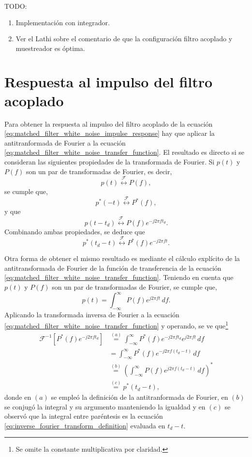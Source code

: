 \documentclass[a4paper]{article}
\begin{document}
% 
\vspace{1cm}
TODO:
\begin{enumerate}
 \item Implementación con integrador.
 \item Ver el Lathi sobre el comentario de que la configuración filtro acoplado y muestreador es óptima.
\end{enumerate}


\newpage

\appendix

\section{Respuesta al impulso del filtro acoplado}\label{ap:matched_filter_impulse_response_derivation}

Para obtener la respuesta al impulso del filtro acoplado de la ecuación \ref{eq:matched_filter_white_noise_impulse_response} hay que aplicar la antitranformada de Fourier a la ecuación \ref{eq:matched_filter_white_noise_transfer_function}. El resultado es directo si se consideran las siguientes propiedades de la transformada de Fourier. Si \(p(t)\) y \(P(f)\) son un par de transformadas de Fourier, es decir,
\[
 p(t)\overset{\mathcal{F}}{\longleftrightarrow}P(f),
\]
 se cumple que,
\[
 p^*(-t)\overset{\mathcal{F}}{\longleftrightarrow}P^*(f),
\]
y que
\[
 p(t-t_d)\overset{\mathcal{F}}{\longleftrightarrow}P(f)e^{-j2\pi ft_d}.
\]
Combinando ambas propiedades, se deduce que
\[
 p^*(t_d-t)\overset{\mathcal{F}}{\longleftrightarrow}P^*(f)e^{-j2\pi ft}.
\]

Otra forma de obtener el mismo resultado es mediante el cálculo explícito de la antitransformada de Fourier de la función de transferencia de la ecuación \ref{eq:matched_filter_white_noise_transfer_function}. Teniendo en cuenta que \(p(t)\) y \(P(f)\) son un par de transformadas de Fourier, se cumple que,
\begin{equation}\label{eq:inverse_fourier_transform_definition}
 p(t)=\int_{-\infty}^{\infty}P(f)e^{j2\pi ft}\,df.
\end{equation}
Aplicando la transformada inversa de Fourier a la ecuación \ref{eq:matched_filter_white_noise_transfer_function} y operando, se ve que\footnote{Se omite la constante multiplicativa por claridad.}
\begin{align*}
 \mathcal{F}^{-1}\left[P^*(f)e^{-j2\pi ft_d}\right]&\overset{(a)}{=}\int_{-\infty}^{\infty}P^*(f)e^{-j2\pi ft_d}e^{j2\pi ft}\,df\\
 &=\int_{-\infty}^{\infty}P^*(f)e^{-j2\pi f(t_d-t)}\,df\\
 &\overset{(b)}{=}\left(\int_{-\infty}^{\infty}P(f)e^{j2\pi f(t_d-t)}\,df\right)^*\\
 &\overset{(c)}{=}p^*(t_d-t),
\end{align*}
donde en \((a)\) se empleó la definición de la antitranformada de Fourier, en \((b)\) se conjugó la integral y su argumento manteniendo la igualdad y en \((c)\) se observó que la integral entre paréntesis es la ecuación \ref{eq:inverse_fourier_transform_definition} evaluada en \(t_d-t\).
 
\end{document}

